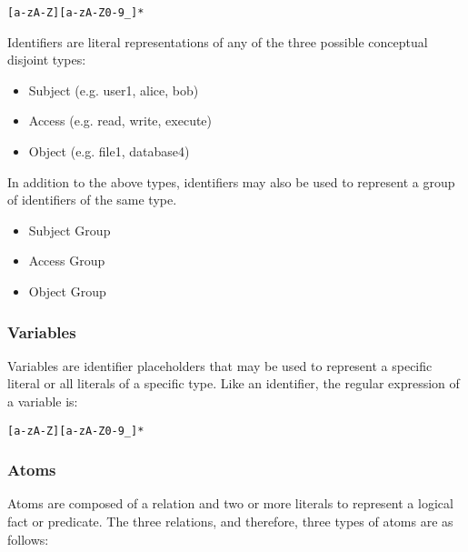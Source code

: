 \documentclass[a4paper]{article}
\begin{document}
\begin{verbatim}
[a-zA-Z][a-zA-Z0-9_]*
\end{verbatim}

        Identifiers are literal representations of any of the three possible
        conceptual disjoint types:

        \begin{itemize}
          \item Subject (e.g. user1, alice, bob)
          \item Access (e.g. read, write, execute)
          \item Object (e.g. file1, database4)
        \end{itemize}

        In addition to the above types, identifiers may also be used to
        represent a group of identifiers of the same type.

        \begin{itemize}
          \item Subject Group
          \item Access Group
          \item Object Group
        \end{itemize}

      \subsubsection{Variables}

        Variables are identifier placeholders that may be used to represent a
        specific literal or all literals of a specific type. Like an identifier,
        the regular expression of a variable is:

\begin{verbatim}
[a-zA-Z][a-zA-Z0-9_]*
\end{verbatim}

      \subsubsection{Atoms}

        Atoms are composed of a relation and two or more literals to represent
        a logical fact or predicate. The three relations, and therefore, three
        types of atoms are as follows:
\end{document}
